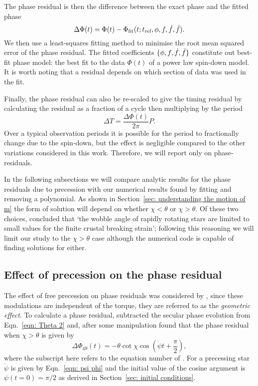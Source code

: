 \documentclass[../full_thesis/full_thesis.tex]{subfiles}
\begin{document}
The phase residual is then the difference between the exact phase
and the fitted phase
\begin{equation}
  \Delta\Phi(t) = \Phi(t) - \Phi_{\mathrm{fit}}(t; t_{\textrm{ref}}, \phi, f, \dot{f}, \ddot{f}).
\end{equation}
We then use a least-squares fitting method to minimise the root mean squared
error of the phase residual. The fitted coefficients $\{\phi, f, \dot{f},
\ddot{f}\}$ constitute out best-fit phase model: the best fit to the data
$\Phi(t)$ of a power law spin-down model.  It is worth noting that a residual
depends on which section of data was used in the fit.

Finally, the phase residual can also be re-scaled to give the timing residual by
calculating the residual as a fraction of a cycle then multiplying by the
period
\begin{equation}
    \Delta T = \frac{\Delta\Phi(t)}{2\pi} P.
    \label{eqn: phase to timing}
\end{equation}
Over a typical observation periods it is possible for the period to
fractionally change due to the spin-down, but the effect is negligible compared
to the other variations considered in this work. Therefore, we will report only
on phase-residuals.

In the following subsections we will compare analytic results for the phase
residuals due to precession with our numerical results found by fitting and
removing a polynomial. As shown in Section~\ref{sec: understanding the motion of m}
the form of solution will depend on whether $\chi < \theta$ or $\chi > \theta$.
Of these two choices, \citet{Jones2001} concluded that `the wobble angle of
rapidly rotating stars are limited to small values for the finite crustal
breaking strain'; following this reasoning we will limit our study to the
$\chi > \theta$ case although the numerical code is capable of finding solutions
for either.

\subsection{Effect of precession on the phase residual}

The effect of free precession on phase residuals was considered by \citet{Nelson1990},
since these modulations are independent of the torque, they are referred to as
the \emph{geometric effect}. To calculate a phase residual, \citet{Jones2001}
subtracted the secular phase evolution from Eqn.~\ref{eqn: Theta 2} and,
after some manipulation found that the phase residual when $\chi > \theta$ is
given by
\begin{equation}
    \Delta\Phi_{49}(t) = -\theta \cot\chi\cos\left(\dot{\psi}t + \frac{\pi}{2}\right),
    \label{eqn: Jones 49}
\end{equation}
where the subscript here refers to the equation number of \citet{Jones2001}.
For a precessing star $\dot{\psi}$ is given by Eqn.~\eqref{eqn: psi phi} and
the initial value of the cosine argument is $\psi(t=0)=\pi/2$ as derived in
Section~\ref{sec: initial conditions}.
\end{document}
